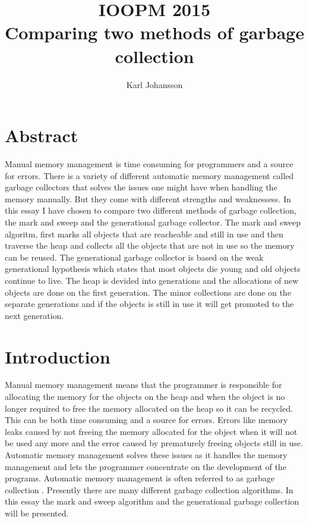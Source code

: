\documentclass[11pt, a4paper]{article}
\title{IOOPM 2015\\ \large{Comparing two methods of garbage collection}}
\author{Karl Johansson}
\begin{document}
\maketitle
\tableofcontents


\section{Abstract}
Manual memory management is time consuming for programmers and a source for errors. There is a variety of different automatic memory management called garbage collectors that solves the issues one might have when handling the memory manually. But they come with different strengths and weaknessess. In this essay I have chosen to compare two different methods of garbage collection, the mark and sweep and the generational garbage collector.
The mark and sweep algoritm, first marks all objects that are reacheable and still in use and then traverse the heap and collects all the objects that are not in use so the memory can be reused. 
The generational garbage collector is based on the weak generational hypothesis which states that most objects die young and old objects continue to live. The heap is devided into generations and the allocations of new objects are done on the first generation. The minor collections are done on the separate generations and if the objects is still in use it will get promoted to the next generation.
\pagebreak

\section{Introduction}

Manual memory management means that the programmer is responsible for allocating the memory for the objects on the heap and when the object is no longer required to free the memory allocated on the heap so it can be recycled. This can be both time consuming and a source for errors. Errors like memory leaks caused by not freeing the memory allocated for the object when it will not be used any more and the error caused by prematurely freeing objects still in use\cite{manual}.
Automatic memory management solves these issues as it handles the memory management and lets the programmer concentrate on the development of the programs. Automatic memory management is often referred to as garbage collection \cite{gc}. Presently there are many different garbage collection algorithms\cite{gc}. In this essay the mark and sweep algorithm and the generational garbage collection will be presented. 
\end{document}

